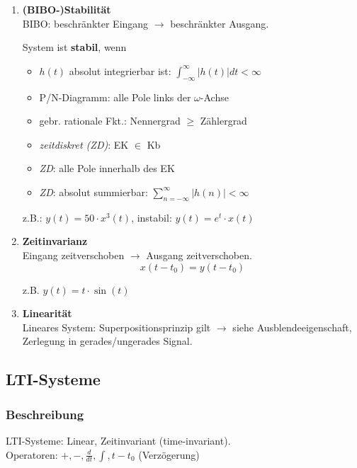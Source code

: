 \begin{enumerate}
  \item {\textbf{(BIBO-)Stabilit\"at}}\\
  \small BIBO: beschr\"ankter Eingang $\rightarrow$ beschr\"ankter Ausgang.\\
\begin{mdframed}[style=exercise]
   System ist \textbf{stabil}, wenn
   \begin{itemize}
   	   \item $h(t)$ absolut integrierbar ist: $\int_{-\infty}^{\infty} |h(t)| dt <\infty$
   	   \item P/N-Diagramm: alle Pole links der $\omega$-Achse
   	   \item gebr. rationale Fkt.: Nennergrad $\ge$ Zählergrad
   	   \item \textit{zeitdiskret (ZD)}: EK $\in$ Kb
   	   \item \textit{ZD}: alle Pole innerhalb
   	   des EK
   	    \item \textit{ZD}: absolut summierbar: $\sum_{n=-\infty}^{\infty} |h(n)|<\infty$
   \end{itemize}
   z.B.: $y(t) = 50\cdot x^3(t)$, instabil: $y(t) = e^{t}\cdot x(t)$
  \end{mdframed}
  \normalsize
  \item{\textbf{Zeitinvarianz}}\\
		{\small
		  	Eingang zeitverschoben $\rightarrow$ Ausgang zeitverschoben.
		}
		\[ 
		x(t-t_0) = y(t-t_0)
		 \]
		 
		 {\small z.B. $y(t)=t\cdot \sin(t)$}
  \item{\textbf{Linearit\"at}}\\
		  {\small
		      Lineares System: Superpositionsprinzip gilt $\rightarrow$ siehe Ausblendeeigenschaft, Zerlegung in gerades/ungerades Signal.
		  }
\end{enumerate}
\normalsize
\subsection{LTI-Systeme}
\subsubsection{Beschreibung}
LTI-Systeme: Linear, Zeitinvariant (time-invariant).\\
Operatoren: $+, -, \frac{d}{dt}, \int, t-t_0$ (Verz\"ogerung)\\

